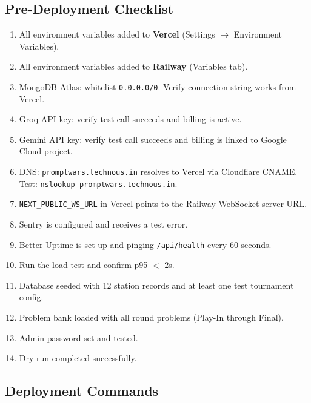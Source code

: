 \documentclass[11pt, a4paper]{article}
\begin{document}
\subsection{Pre-Deployment Checklist}

\begin{tcolorbox}[alertbox, title={Complete Every Item Before Going Live}]
\begin{enumerate}[leftmargin=1cm, itemsep=3pt]
    \item All environment variables added to \textbf{Vercel} (Settings $\to$ Environment Variables).
    \item All environment variables added to \textbf{Railway} (Variables tab).
    \item MongoDB Atlas: whitelist \texttt{0.0.0.0/0}. Verify connection string works from Vercel.
    \item Groq API key: verify test call succeeds and billing is active.
    \item Gemini API key: verify test call succeeds and billing is linked to Google Cloud project.
    \item DNS: \texttt{promptwars.technous.in} resolves to Vercel via Cloudflare CNAME. Test: \texttt{nslookup promptwars.technous.in}.
    \item \texttt{NEXT\_PUBLIC\_WS\_URL} in Vercel points to the Railway WebSocket server URL.
    \item Sentry is configured and receives a test error.
    \item Better Uptime is set up and pinging \texttt{/api/health} every 60 seconds.
    \item Run the load test and confirm p95 $<$ 2s.
    \item Database seeded with 12 station records and at least one test tournament config.
    \item Problem bank loaded with all round problems (Play-In through Final).
    \item Admin password set and tested.
    \item Dry run completed successfully.
\end{enumerate}
\end{tcolorbox}

\subsection{Deployment Commands}
\end{document}

